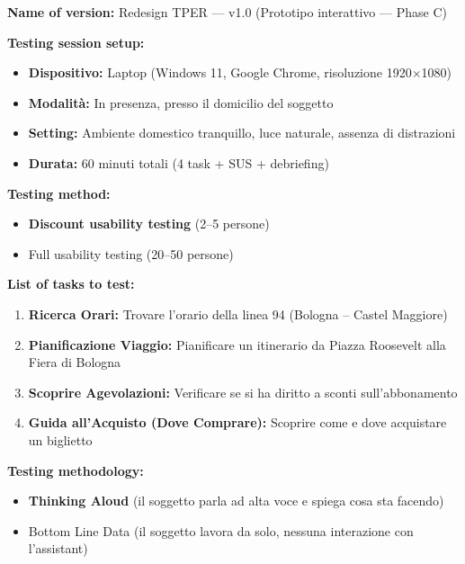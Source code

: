 \documentclass[11pt,a4paper]{article}
\begin{document}
\begin{tcolorbox}[colback=backgroundColor,colframe=borderColor,arc=2mm]
\small

\noindent\textbf{Name of version:} Redesign TPER --- v1.0 (Prototipo interattivo --- Phase C)

\vspace{0.3cm}
\noindent\textbf{Testing session setup:}
\begin{itemize}
  \item \textbf{Dispositivo:} Laptop (Windows 11, Google Chrome, risoluzione 1920$\times$1080)
  \item \textbf{Modalit\`a:} In presenza, presso il domicilio del soggetto
  \item \textbf{Setting:} Ambiente domestico tranquillo, luce naturale, assenza di distrazioni
  \item \textbf{Durata:} 60 minuti totali (4 task + SUS + debriefing)
\end{itemize}

\vspace{0.3cm}
\noindent\textbf{Testing method:}
\begin{itemize}
  \item[$\checkmark$] \textbf{Discount usability testing} (2--5 persone)
  \item[$\circ$] Full usability testing (20--50 persone)
\end{itemize}

\vspace{0.3cm}
\noindent\textbf{List of tasks to test:}
\begin{enumerate}
  \item \textbf{Ricerca Orari:} Trovare l'orario della linea 94 (Bologna -- Castel Maggiore)
  \item \textbf{Pianificazione Viaggio:} Pianificare un itinerario da Piazza Roosevelt alla Fiera di Bologna
  \item \textbf{Scoprire Agevolazioni:} Verificare se si ha diritto a sconti sull'abbonamento
  \item \textbf{Guida all'Acquisto (Dove Comprare):} Scoprire come e dove acquistare un biglietto
\end{enumerate}

\vspace{0.3cm}
\noindent\textbf{Testing methodology:}
\begin{itemize}
  \item[$\checkmark$] \textbf{Thinking Aloud} (il soggetto parla ad alta voce e spiega cosa sta facendo)
  \item[$\circ$] Bottom Line Data (il soggetto lavora da solo, nessuna interazione con l'assistant)
\end{itemize}


\end{tcolorbox}
\end{document}
